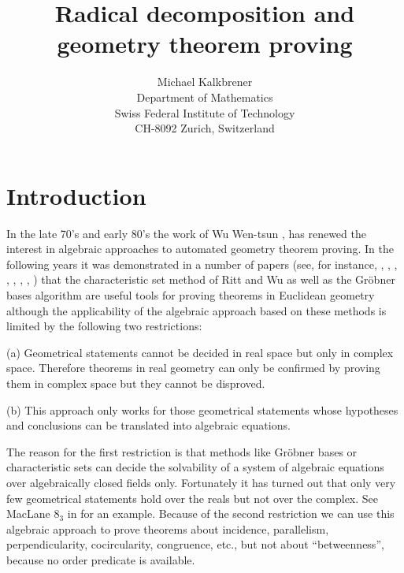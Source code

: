 
\title{Radical decomposition and geometry theorem proving}
\author{Michael Kalkbrener\\Department of Mathematics\\
Swiss Federal Institute of 
Technology\\
CH-8092 Zurich, Switzerland}

\textheight     600pt
\textwidth      420pt
\topmargin       18pt
\oddsidemargin   30pt
\evensidemargin  30pt

\date{} 
\newtheorem{theorem}{Theorem}
\newtheorem{example}{Example}
\newtheorem{lemma}{Lemma}




\maketitle

\section{Introduction}
In the late 70's and early 80's the work of Wu Wen-tsun \cite{Wu78},
\cite{Wu84} has renewed the interest in algebraic approaches to
automated geometry theorem
proving. In the following years it was demonstrated in a number of papers
(see, for instance, \cite{Chou88}, \cite{ChGa90a}, \cite{KoHu85}, 
\cite{KaWa90}, \cite{Wang92a}, \cite{ChSc86}, \cite{Kapu86a}, 
\cite{KuSt86b}) 
that the characteristic set method of Ritt and Wu
as well as the Gr\"obner bases 
algorithm are
useful tools for proving theorems in Euclidean geometry
although the applicability
of the algebraic approach based on these methods 
is limited by the following two restrictions:

\smallskip
\noindent
(a) Geometrical statements cannot be decided in real space but only
in complex space. Therefore theorems in real geometry can only be confirmed 
by proving them in complex space but they cannot be disproved.

\noindent
(b) This approach only works for those geometrical statements whose 
hypotheses and conclusions can be translated into 
algebraic 
equations. 

\smallskip
The reason for the first restriction is that methods like Gr\"obner bases or 
characteristic sets
can decide
the solvability of a system of algebraic equations over algebraically
closed fields only. Fortunately it has turned out that only very few
geometrical statements hold over the reals but not over the complex.
See MacLane $8_3$ in \cite{Kutz88} for an example. Because of
the second restriction we can use this algebraic approach to
prove theorems about 
incidence, parallelism, perpendicularity,
cocircularity, congruence, etc., but not about ``betweenness'', because 
no order predicate is available.

